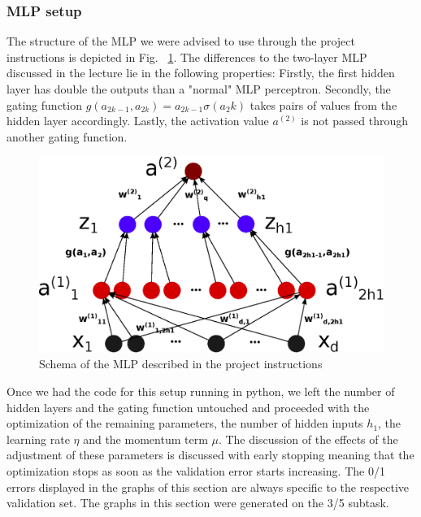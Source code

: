 \subsubsection{MLP setup}
The structure of the MLP we were advised to use through the project instructions is depicted in Fig. ~\ref{fig:mlp}. The differences to the two-layer MLP discussed in the lecture lie in the following properties: Firstly, the first hidden layer has double the outputs than a "normal" MLP perceptron. Secondly, the gating function $g(a_{2k-1}, a_{2k})=a_{2k-1}\sigma(a_2k)$ takes pairs of values from the hidden layer accordingly. Lastly, the activation value $a^{(2)}$ is not passed through another gating function.
\begin{figure}[!h]
	\centering
	\includegraphics[width=.6\textwidth]{mlp/mlp.eps}
	\caption{Schema of the MLP described in the project instructions}
	\label{fig:mlp}
\end{figure}
Once we had the code for this setup running in python, we left the number of hidden layers and the gating function untouched and proceeded with the optimization of the remaining parameters, the number of hidden inputs $h_1$, the learning rate $\eta$ and the momentum term $\mu$. The discussion of the effects of the adjustment of these parameters is discussed with early stopping meaning that the optimization stops as soon as the validation error starts increasing. The 0/1 errors displayed in the graphs of this section are always specific to the respective validation set. The graphs in this section were generated on the 3/5 subtask.

